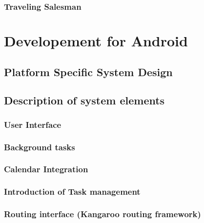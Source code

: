 \documentclass[11pt,a4paper]{scrreprt}
\begin{document}
	\subsection{Traveling Salesman}
	\label{sub:routing_tsm}
	
	

\chapter{Developement for Android} %
\label{chp:android}
%

	\section{Platform Specific System Design} %
	\label{sec:android_desing}
	
	
	\section{Description of system elements} %
	
	\subsection{User Interface} %
	\label{sec:user_interface}
	
	
	\subsection{Background tasks} %
	\label{sec:android_integration}
	
	
	\subsection{Calendar Integration} %
	\label{sec:android_calendar}
	
	
	\subsection{Introduction of Task management} %
	\label{sec:android_task}
	
		
	\newpage
	\subsection{Routing interface (Kangaroo routing framework)} %
	\label{sub:routing_interface}
	
	
\end{document}

